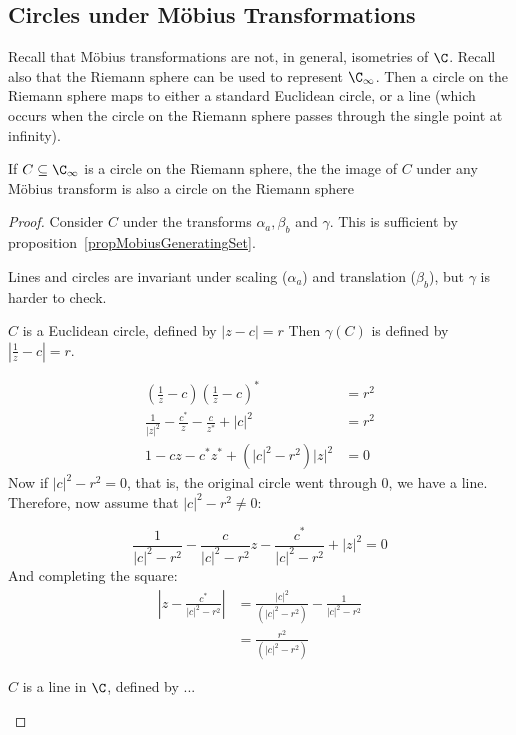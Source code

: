 \documentclass[../Main.tex]{subfiles}
\begin{document}
\subsection{Circles under M\"obius Transformations}
Recall that M\"obius transformations are not, in general, isometries of $\C$. Recall also that the Riemann sphere can be used to represent $\CInf$. Then a circle on the Riemann sphere maps to either a standard Euclidean circle, or a line (which occurs when the circle on the Riemann sphere passes through the single point at infinity).
\begin{theorem}
    If $C \subseteq \CInf$ is a circle on the Riemann sphere, the the image of $C$ under any M\"obius transform is also a circle on the Riemann sphere
    \label{thmCirclesMobius}
\end{theorem}
\begin{proof}
    Consider $C$ under the transforms $\alpha_a, \beta_b$ and $\gamma$. This is sufficient by proposition~\ref{propMobiusGeneratingSet}.\par
    Lines and circles are invariant under scaling ($\alpha_a$) and translation ($\beta_b$), but $\gamma$ is harder to check.
    \begin{case}{$C$ is a Euclidean circle, defined by $|z - c| = r$}
        Then $\gamma(C)$ is defined by $|\frac{1}{z} - c| = r$.\par
        \begin{align*}
            \left(\frac{1}{z} - c\right)\left(\frac{1}{z} - c\right)^* &= r^2 \\
            \frac{1}{|z|^2} - \frac{c^*}{z} - \frac{c}{z^*} + |c|^2 &= r^2 \\
            1 - cz - c^* z^* + (|c|^2 - r^2)|z|^2 &= 0
        \end{align*}
        Now if $|c|^2 - r^2 = 0$, that is, the original circle went through 0, we have a line. Therefore, now assume that $|c|^2 - r^2 \neq 0$:\par
        \begin{equation*}
            \frac{1}{|c|^2 - r^2} - \frac{c}{|c|^2 - r^2}z - \frac{c^*}{|c|^2 - r^2} + |z|^2 = 0
        \end{equation*}
        And completing the square:
        \begin{align*}
            \left|z  - \frac{c^*}{|c|^2 - r^2}\right| &= \frac{|c|^2}{\left(|c|^2 - r^2\right)} - \frac{1}{|c|^2 - r^2} \\
            &= \frac{r^2}{\left(|c|^2 - r^2\right)}
        \end{align*}
    \end{case}
    \begin{case}{$C$ is a line in $\C$, defined by ...}
    \end{case}
\end{proof}
\end{document}
